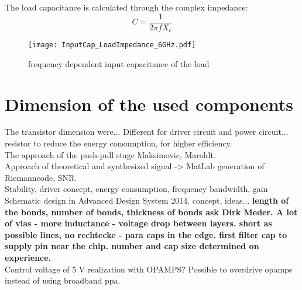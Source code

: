 The load capacitance is calculated through the complex impedance:
\begin{equation}
C = \frac{1}{2 \pi f X_c}
\end{equation}

 \begin{figure}[ht]
	\centering
  \texttt{[image: InputCap\_LoadImpedance\_6GHz.pdf]}
	\caption{frequency dependent input capacitance of the load}
	\label{fig:smith_load_impedance_inC}
\end{figure}

\section{Dimension of the used components}
The transistor dimension were... Different for driver circuit and power circuit... resistor to reduce the energy  consumption, for higher efficiency. \\ The
approach of the push-pull stage Maksimovic, Maroldt.\\
Approach of theoretical and synthesized signal -> MatLab generation of Riemanncode, SNR.\\ Stability, driver concept, energy consumption, frequency bandwidth, gain
Schematic design in Advanced Design System 2014. concept, ideas... 
\textbf{length of the bonds, number of bonds, thickness of bonds ask Dirk Meder. A lot of vias - more inductance - voltage drop between layers. short as possible lines, no rechtecke - para caps in the edge. first filter cap to supply pin near the chip. number and cap size determined on experience. }\\
Control voltage of 5 V realization with OPAMPS? Possible to overdrive opamps instead of using broadband ppa. 


